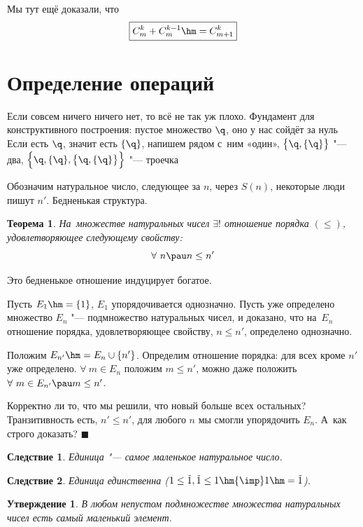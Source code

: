 \documentclass[a4paper,10pt,twoside]{article}
\newtheorem{The}{Теорема}[section]
\newtheorem{Sl}{Следствие}[section]
\newtheorem{Ut}{Утверждение}[section]
\newenvironment{Proof}
       {\par\noindent{\textbf{Доказательство.}}}
       {\hfill$\scriptstyle\blacksquare$}
\let\AVsection\section{}
\renewcommand\section{\newpage\scol\AVsection}
\newcommand{\scol}{  \renewcommand{\headrulewidth}{0.5pt}\fancyhead[RE,LO]{\thesection{} \leftmark} \fancyhead[LE,RO]{\thepage}}
\begin{document}
Мы тут ещё доказали, что \[
    \boxed{C_m^k+C_m^{k-1}\hm=C_{m+1}^k}    \]

    \section{Определение операций}

Если совсем ничего ничего нет, то всё не так уж плохо.
Фундамент для конструктивного построения: пустое множество $\q$, оно у нас сойдёт за нуль
Если есть $\q$, значит есть $\{\q\}$, напишем рядом с~ним «один»,
$\big\{\q,\{\q\}\big\}$ "--- два,
$\Big\{\q,\{\q\},\big\{\q,\{\q\}\big\}\Big\}$ "--- троечка\ldotst{}

Обозначим натуральное число, следующее за $n$, через $S(n)$, некоторые люди пишут $n'$. Бедненькая структура.

\begin{The}
    На~множестве натуральных чисел $\exists!$ отношение порядка $(\leq)$, удовлетворяющее следующему свойству:
    \[\forall\  n\pau n\leq n'\]
\end{The}

Это бедненькое отношение индуцирует богатое.
\begin{Proof}
    Пусть $E_1\hm=\{1\}$, $E_1$ упорядочивается однозначно. Пусть
     уже определено множество $E_n$ "--- подмножество натуральных чисел, и доказано, что на~$E_n$ отношение порядка,
      удовлетворяющее свойству, $n\leq n'$, определено однозначно.

    Положим $E_{n'}\hm=E_n\cup\{n'\}$. Определим отношение порядка: для всех кроме $n'$ уже определено.
     $\forall\  m\in E_n$ положим $m\leq n'$, можно даже положить $\forall\  m\in E_{n'}\pau m\leq n'$.

    Корректно ли то, что мы решили, что новый больше всех остальных?
      Транзитивность есть, $n'\leq n'$, для любого $n$ мы смогли упорядочить $E_n$. А~как строго доказать?
\end{Proof}

\begin{Sl}
    Единица "--- самое маленькое натуральное число.
\end{Sl}

\begin{Sl}
    Единица единственна ($1\leq\tilde 1,\tilde 1\leq 1 \hm{\imp} 1\hm=\tilde 1$).
\end{Sl}

\begin{Ut}
В любом непустом подмножестве множества натуральных чисел есть самый маленький элемент.
\end{Ut}
\end{document}
